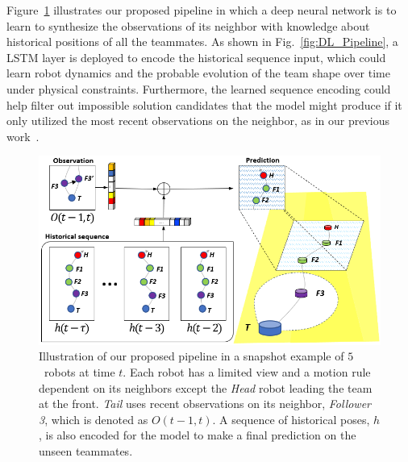 \documentclass[letterpaper, 10 pt, conference]{ieeeconf}  %
\begin{document}
	Figure~\ref{fig:Concept} illustrates our proposed pipeline in which
	a deep neural network is to learn to synthesize the observations of its neighbor
	with knowledge about historical positions of all the teammates.
	As shown in Fig.~\ref{fig:DL_Pipeline}, a LSTM layer is deployed to encode
    the historical sequence input, which could learn robot dynamics and
    the probable evolution of the team shape over time under physical
    constraints. Furthermore, the learned sequence encoding could help
    filter out impossible solution candidates that the model might
    produce if it only utilized the most recent observations on the neighbor,
    as in our previous work~\cite{CPR17}.
	\begin{figure}\centering
		\includegraphics[width=1.\columnwidth]{fig_Concept}
		\caption{Illustration of our proposed pipeline in a snapshot example of
			$5$~robots at time $t$.
			Each robot has a limited view and a motion rule dependent on its neighbors
			except the \emph{Head} robot leading the team at the front.
			\emph{Tail} uses recent observations on its neighbor, \emph{Follower 3},
			which is denoted as $O(t-1,t)$. A sequence of historical poses, $h$, is
			also encoded for the model to make a final prediction on the
			unseen teammates.
		}
		\label{fig:Concept}
	\end{figure}
\end{document}
